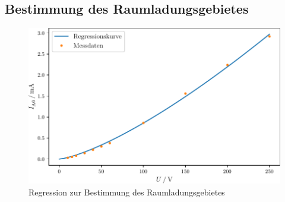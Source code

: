 \subsection{Bestimmung des Raumladungsgebietes}
\begin{figure}
    \centering
    \caption{Regression zur Bestimmung des Raumladungsgebietes}
    \label{fig:exponent}
    \includegraphics[width = \textwidth]{build/exponent.pdf}
\end{figure}